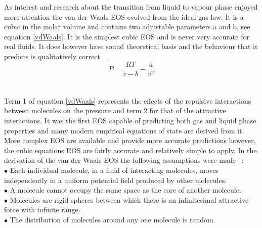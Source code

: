 		As interest and research about the transition from liquid to vapour phase enjoyed more attention the van der Waals EOS evolved from the ideal gas law. It is a cubic in the molar volume and contains two adjustable parameters a and b, see equation \ref{vdWaals}. It is the simplest cubic EOS and is never very accurate for real fluids. It does however have sound theoretical basis and the behaviour that it predicts is qualitatively correct ~\cite{Assael}.\\%
				\begin{equation}%
						P  = \dfrac{RT}{v - b} - \dfrac{a}{v^{2}} \label{vdWaals}%
				\end{equation}\\%
			\\%
	Term 1 of equation \ref{vdWaals} represents the effects of the repulsive interactions between molecules on the pressure and term 2 for that of the attractive interactions. It was the first EOS capable of predicting both gas and liquid phase properties and many modern empirical equations of state are derived from it. More complex EOS are available and provide more accurate predictions however, the cubic equations EOS are fairly accurate and relatively simple to apply. In the derivation of the van der Waals EOS the following assumptions were made ~\cite{ThermophysicalProperties}:\\
$\bullet$ Each individual molecule, in a fluid of interacting molecules, moves independently in a uniform potential field produced by other molecules.\\
$\bullet$ A molecule cannot occupy the same space as the core of another molecule.\\
$\bullet$ Molecules are rigid spheres between which there is an infinitesimal attractive force with infinite range.\\
$\bullet$ The distribution of molecules around any one molecule is random.\\

